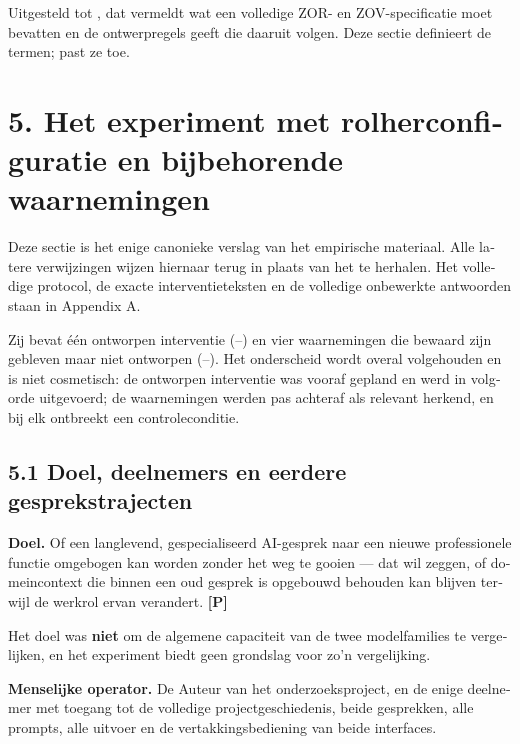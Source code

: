 \begin{dutch}
Uitgesteld tot , dat vermeldt wat een volledige ZOR- en ZOV-specificatie moet bevatten en de ontwerpregels geeft die daaruit volgen. Deze sectie definieert de termen;  past ze toe.


\section*{5. Het experiment met rolherconfiguratie en bijbehorende waarnemingen}
\label{sec:nl:5}

Deze sectie is het enige canonieke verslag van het empirische materiaal. Alle latere verwijzingen wijzen hiernaar terug in plaats van het te herhalen. Het volledige protocol, de exacte interventieteksten en de volledige onbewerkte antwoorden staan in Appendix A.

Zij bevat één ontworpen interventie (–) en vier waarnemingen die bewaard zijn gebleven maar niet ontworpen (–). Het onderscheid wordt overal volgehouden en is niet cosmetisch: de ontworpen interventie was vooraf gepland en werd in volgorde uitgevoerd; de waarnemingen werden pas achteraf als relevant herkend, en bij elk ontbreekt een controleconditie.


\subsection*{5.1 Doel, deelnemers en eerdere gesprekstrajecten}
\label{sec:nl:5.1}

\textbf{Doel.} Of een langlevend, gespecialiseerd AI-gesprek naar een nieuwe professionele functie omgebogen kan worden zonder het weg te gooien — dat wil zeggen, of domeincontext die binnen een oud gesprek is opgebouwd behouden kan blijven terwijl de werkrol ervan verandert. \textbf{[P]}

Het doel was \textbf{niet} om de algemene capaciteit van de twee modelfamilies te vergelijken, en het experiment biedt geen grondslag voor zo'n vergelijking.

\textbf{Menselijke operator.} De Auteur van het onderzoeksproject, en de enige deelnemer met toegang tot de volledige projectgeschiedenis, beide gesprekken, alle prompts, alle uitvoer en de vertakkingsbediening van beide interfaces.


\end{dutch}
